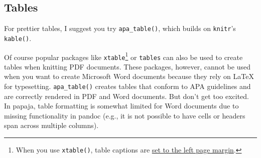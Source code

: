 \documentclass[man,floatsintext]{apa6}
\newenvironment{Shaded}{\begin{snugshade}}{\end{snugshade}}
\newcommand{\KeywordTok}[1]{\textcolor[rgb]{0.13,0.29,0.53}{\textbf{#1}}}
\newcommand{\DataTypeTok}[1]{\textcolor[rgb]{0.13,0.29,0.53}{#1}}
\newcommand{\DecValTok}[1]{\textcolor[rgb]{0.00,0.00,0.81}{#1}}
\newcommand{\StringTok}[1]{\textcolor[rgb]{0.31,0.60,0.02}{#1}}
\newcommand{\OtherTok}[1]{\textcolor[rgb]{0.56,0.35,0.01}{#1}}
\newcommand{\OperatorTok}[1]{\textcolor[rgb]{0.81,0.36,0.00}{\textbf{#1}}}
\newcommand{\NormalTok}[1]{#1}
\let\rmarkdownfootnote\footnote%
\def\footnote{\protect\rmarkdownfootnote}
\theoremstyle{definition}
\theoremstyle{definition}
\theoremstyle{definition}
\theoremstyle{remark}
\begin{document}
\hypertarget{tables}{\subsection{Tables}\label{tables}}

For prettier tables, I suggest you try \texttt{apa\_table()}, which
builds on \texttt{knitr}'s \texttt{kable()}.







\begin{Shaded}
\end{Shaded}

Of course popular packages like \texttt{xtable}\footnote{When you use
  \texttt{xtable()}, table captions are
  \href{http://tex.stackexchange.com/questions/42209/centering-tables-in-document-class-apa6}{set
  to the left page margin}.} or \texttt{tables} can also be used to
create tables when knitting PDF documents. These packages, however,
cannot be used when you want to create Microsoft Word documents because
they rely on LaTeX for typesetting. \texttt{apa\_table()} creates tables
that conform to APA guidelines and are correctly rendered in PDF and
Word documents. But don't get too excited. In papaja, table formatting
is somewhat limited for Word documents due to missing functionality in
pandoc (e.g., it is not possible to have cells or headers span across
multiple columns).
\end{document}

